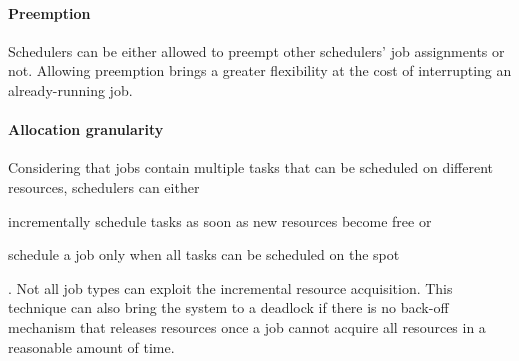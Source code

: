 \paragraph{Preemption}
Schedulers can be either allowed to preempt other schedulers' job assignments or not.
Allowing preemption brings a greater flexibility at the cost of interrupting an already-running job.

\paragraph{Allocation granularity}
Considering that jobs contain multiple tasks that can be scheduled on different resources, schedulers can either
\begin{mylist}
    \item incrementally schedule tasks as soon as new resources become free or
    \item schedule a job only when all tasks can be scheduled on the spot
\end{mylist}.
Not all job types can exploit the incremental resource acquisition.
This technique can also bring the system to a deadlock if there is no back-off mechanism that releases resources once a job cannot acquire all resources in a reasonable amount of time.